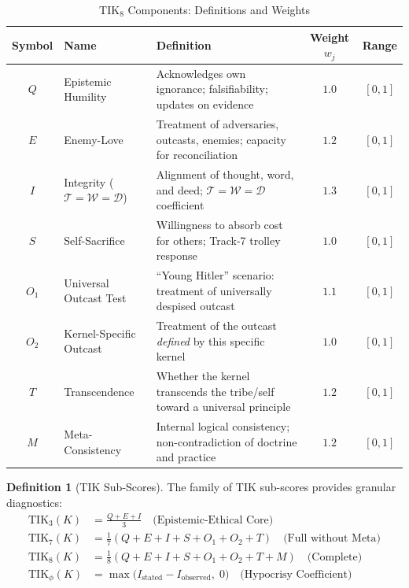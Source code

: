 \documentclass[11pt,a4paper]{article}
\theoremstyle{definition}
\newtheorem{definition}[theorem]{Definition}
\theoremstyle{remark}
\newcommand{\TIKthree}{\text{TIK}_3}
\newcommand{\TIKseven}{\text{TIK}_7}
\newcommand{\TIKeight}{\text{TIK}_8}
\newcommand{\TIKpharisee}{\text{TIK}_{\phi}}    %
\newcommand{\Thought}{\mathcal{T}}
\newcommand{\Word}{\mathcal{W}}
\newcommand{\Deed}{\mathcal{D}}
\newcommand{\IntegrityAxiom}{\Thought = \Word = \Deed}
\begin{document}
\begin{table}[H]
\centering
\caption{TIK$_8$ Components: Definitions and Weights}
\label{tab:tik-components}
\begin{tabularx}{\textwidth}{@{}clXcc@{}}
\toprule
\textbf{Symbol} & \textbf{Name} & \textbf{Definition} &
  \textbf{Weight $w_j$} & \textbf{Range} \\
\midrule
$Q$ & Epistemic Humility &
  Acknowledges own ignorance; falsifiability;
  updates on evidence &
  $1.0$ & $[0,1]$ \\[3pt]
$E$ & Enemy-Love &
  Treatment of adversaries, outcasts, enemies;
  capacity for reconciliation &
  $1.2$ & $[0,1]$ \\[3pt]
$I$ & Integrity ($\IntegrityAxiom$) &
  Alignment of thought, word, and deed;
  $\Thought = \Word = \Deed$ coefficient &
  $1.3$ & $[0,1]$ \\[3pt]
$S$ & Self-Sacrifice &
  Willingness to absorb cost for others;
  Track-7 trolley response &
  $1.0$ & $[0,1]$ \\[3pt]
$O_1$ & Universal Outcast Test &
  ``Young Hitler'' scenario: treatment of
  universally despised outcast &
  $1.1$ & $[0,1]$ \\[3pt]
$O_2$ & Kernel-Specific Outcast &
  Treatment of the outcast \textit{defined}
  by this specific kernel &
  $1.0$ & $[0,1]$ \\[3pt]
$T$ & Transcendence &
  Whether the kernel transcends the tribe/self
  toward a universal principle &
  $1.2$ & $[0,1]$ \\[3pt]
$M$ & Meta-Consistency &
  Internal logical consistency;
  non-contradiction of doctrine and practice &
  $1.2$ & $[0,1]$ \\
\bottomrule
\end{tabularx}
\end{table}

\begin{definition}[TIK Sub-Scores]
\label{def:tik-subscores}
The family of TIK sub-scores provides granular diagnostics:
\begin{align}
  \TIKthree(K) &= \frac{Q + E + I}{3}
    \quad \text{(Epistemic-Ethical Core)} \label{eq:tik3}\\[4pt]
  \TIKseven(K) &= \frac{1}{7}(Q+E+I+S+O_1+O_2+T)
    \quad \text{(Full without Meta)} \label{eq:tik7}\\[4pt]
  \TIKeight(K) &= \frac{1}{8}(Q+E+I+S+O_1+O_2+T+M)
    \quad \text{(Complete)} \label{eq:tik8b}\\[4pt]
  \TIKpharisee(K) &= \max\!\bigl(I_{\text{stated}} - I_{\text{observed}},\; 0\bigr)
    \quad \text{(Hypocrisy Coefficient)} \label{eq:tikpharisee}
\end{align}
\end{definition}
\end{document}
